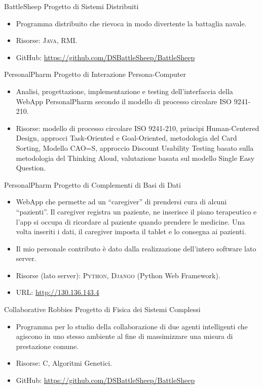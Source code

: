 {BattleSheep}
{Progetto di Sistemi Distribuiti}
{}
{}
{\begin{itemize}
	\item Programma distribuito che rievoca in modo divertente la battaglia
	navale.
	\item Risorse: \textsc{Java}, \textsc{RMI}.
	\item GitHub: \url{https://github.com/DSBattleSheep/BattleSheep}
\end{itemize}}

{PersonalPharm}
{Progetto di Interazione Persona-Computer}
{}
{}
{\begin{itemize}
	\item Analisi, progettazione, implementazione e testing dell'interfaccia
	della WebApp PersonalPharm secondo il modello di processo circolare ISO
	9241-210.
	\item Risorse: modello di processo circolare ISO 9241-210, principi
	Human-Centered Design, approcci Task-Oriented e Goal-Oriented, metodologia
	del Card Sorting, Modello CAO=S, approccio Discount Usability Testing basato
	sulla metodologia del Thinking Aloud, valutazione basata sul modello Single
	Easy Question.
\end{itemize}}

{PersonalPharm}
{Progetto di Complementi di Basi di Dati}
{}
{}
{\begin{itemize}
	\item WebApp che permette ad un ``caregiver'' di prendersi cura di alcuni
	``pazienti''. Il caregiver registra un paziente, ne inserisce il piano
	terapeutico e l'app si occupa di ricordare al paziente quando prendere le
	medicine. Una volta inseriti i dati, il caregiver imposta il tablet e lo
	consegna ai pazienti.
	\item Il mio personale contributo è dato dalla realizzazione dell'intero
	software lato server.
	\item Risorse (lato server): \textsc{Python}, \textsc{Django} (Python Web
	Framework).
	\item URL: \url{http://130.136.143.4}
\end{itemize}}

{Collaborative Robbies}
{Progetto di Fisica dei Sistemi Complessi}
{}
{}
{\begin{itemize}
	\item Programma per lo studio della collaborazione di due agenti
	intelligenti che agiscono in uno stesso ambiente al fine di massimizzare una
	misura di prestazione comune.
	\item Risorse: \textsc{C}, Algoritmi Genetici.
	\item GitHub: \url{https://github.com/DSBattleSheep/BattleSheep}
\end{itemize}}
